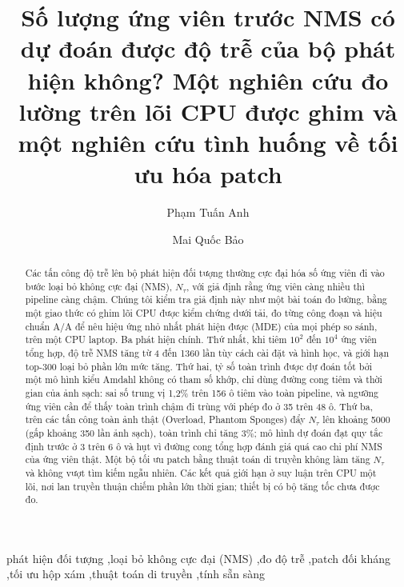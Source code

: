 \documentclass[a4paper,fleqn]{cas-dc}
\newcommand{\Ntau}{N_{\tau}}
\begin{document}
\let\WriteBookmarks\relax
\def\floatpagepagefraction{1}
\def\textpagefraction{.001}
\title[mode=title]{Số lượng ứng viên trước NMS có dự đoán được độ trễ của bộ phát hiện không? Một nghiên cứu đo lường trên lõi CPU được ghim và một nghiên cứu tình huống về tối ưu hóa patch}
\author[1]{Phạm Tuấn Anh}
\author[1]{Mai Quốc Bảo}

\begin{abstract}
Các tấn công độ trễ lên bộ phát hiện đối tượng thường cực đại hóa số ứng viên đi vào bước loại bỏ không cực đại (NMS), $\Ntau$, với giả định rằng ứng viên càng nhiều thì pipeline càng chậm. Chúng tôi kiểm tra giả định này như một bài toán đo lường, bằng một giao thức có ghim lõi CPU được kiểm chứng dưới tải, đo từng công đoạn và hiệu chuẩn A/A để nêu hiệu ứng nhỏ nhất phát hiện được (MDE) của mọi phép so sánh, trên một CPU laptop. Ba phát hiện chính. Thứ nhất, khi tiêm $10^2$ đến $10^4$ ứng viên tổng hợp, độ trễ NMS tăng từ 4 đến 1360 lần tùy cách cài đặt và hình học, và giới hạn top-300 loại bỏ phần lớn mức tăng. Thứ hai, tỷ số toàn trình được dự đoán tốt bởi một mô hình kiểu Amdahl không có tham số khớp, chỉ dùng đường cong tiêm và thời gian của ảnh sạch: sai số trung vị 1,2\% trên 156 ô tiêm vào toàn pipeline, và ngưỡng ứng viên cần để thấy toàn trình chậm đi trùng với phép đo ở 35 trên 48 ô. Thứ ba, trên các tấn công toàn ảnh thật (Overload, Phantom Sponges) đẩy $\Ntau$ lên khoảng 5000 (gấp khoảng 350 lần ảnh sạch), toàn trình chỉ tăng 3\%; mô hình dự đoán đạt quy tắc định trước ở 3 trên 6 ô và hụt vì đường cong tổng hợp đánh giá quá cao chi phí NMS của ứng viên thật. Một bộ tối ưu patch bằng thuật toán di truyền không làm tăng $\Ntau$ và không vượt tìm kiếm ngẫu nhiên. Các kết quả giới hạn ở suy luận trên CPU một lõi, nơi lan truyền thuận chiếm phần lớn thời gian; thiết bị có bộ tăng tốc chưa được đo.
\end{abstract}

\begin{keywords}[Từ khóa]
phát hiện đối tượng \sep loại bỏ không cực đại (NMS) \sep đo độ trễ \sep patch đối kháng \sep tối ưu hộp xám \sep thuật toán di truyền \sep tính sẵn sàng
\end{keywords}
\maketitle
\end{document}
